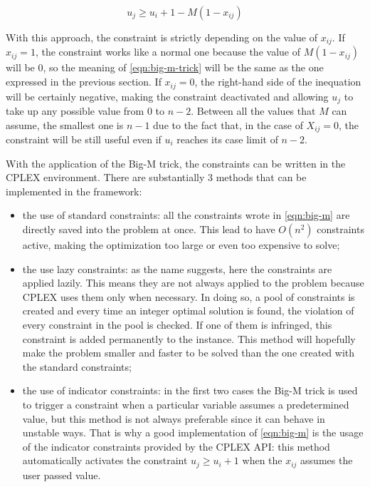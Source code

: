 \begin{equation}
\label{eqn:big-m-trick}
u_j\ge u_i+1-M(1-x_{ij})
\end{equation}

With this approach, the constraint is strictly depending on the value of $x_{ij}$. If $x_{ij}=1$, the constraint works like a normal one because the value of $M(1-x_{ij})$ will be $0$, so the meaning of \ref{eqn:big-m-trick} will be the same as the one expressed in the previous section. 
If $x_{ij}=0$, the right-hand side of the inequation will be certainly negative, making the constraint deactivated and allowing $u_j$ to take up any possible value from $0$ to $n-2$. Between all the values that $M$ can assume, the smallest one is $n-1$ due to the fact that, in the case of $X_{ij}=0$, the constraint will be still useful even if $u_i$ reaches its case limit of $n-2$.

With the application of the Big-M trick, the constraints can be written in the CPLEX environment. There are substantially 3 methods that can be implemented in the framework:

\begin{itemize}
	\item the use of standard constraints: all the constraints wrote in \ref{eqn:big-m} are directly saved into the problem at once. This lead to have $O(n^2)$ constraints active, making the optimization too large or even too expensive to solve;
	
	\item the use lazy constraints: as the name suggests, here the constraints are applied lazily. This means they are not always applied to the problem because CPLEX uses them only when necessary. In doing so, a pool of constraints is created and every time an integer optimal solution is found, the violation of every constraint in the pool is checked.
	If one of them is infringed, this constraint is added permanently to the instance. This method will hopefully make the problem smaller and faster to be solved than the one created with the standard constraints;
	
	\item the use of indicator constraints: in the first two cases the Big-M trick is used to trigger a constraint when a particular variable assumes a predetermined value, but this method is not always preferable since it can behave in unstable ways. That is why a good implementation of \ref{eqn:big-m} is the usage of the indicator constraints provided by the CPLEX API: this method automatically activates the constraint $u_j \ge u_i + 1$ when the $x_{ij}$ assumes the user passed value.
\end{itemize}